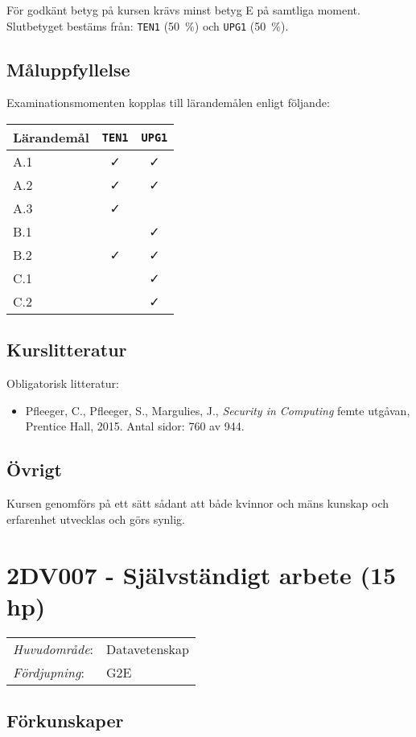 För godkänt betyg på kursen krävs minst betyg E på samtliga moment.
Slutbetyget bestäms från: \texttt{TEN1} (50~\%) och \texttt{UPG1} (50~\%).

\subsection*{Måluppfyllelse}

Examinationsmomenten kopplas till lärandemålen enligt följande:

\begin{longtable}[]{@{}lcc@{}}
\toprule
\textsf{Lärandemål} & \texttt{TEN1} & \texttt{UPG1}\tabularnewline
\midrule
\endhead
A.1 & \faCheck & \faCheck\tabularnewline
A.2 & \faCheck & \faCheck\tabularnewline
A.3 & \faCheck &\tabularnewline
B.1 & & \faCheck\tabularnewline
B.2 & \faCheck & \faCheck\tabularnewline
C.1 & & \faCheck\tabularnewline
C.2 & & \faCheck\tabularnewline
\bottomrule
\end{longtable}

\subsection*{Kurslitteratur}

Obligatorisk litteratur:

\begin{itemize}
\tightlist
\item
  Pfleeger, C., Pfleeger, S., Margulies, J., \emph{Security in
  Computing} femte utgåvan, Prentice Hall, 2015. Antal sidor: 760 av
  944.
\end{itemize}

\subsection*{Övrigt}

Kursen genomförs på ett sätt sådant att både kvinnor och mäns kunskap och erfarenhet utvecklas och görs synlig.
\pagebreak
\section*{2DV007 - Självständigt arbete (15 hp)}

\begin{tabular}{ll}\emph{Huvudområde}: & Datavetenskap\tabularnewline\emph{Fördjupning}: & G2E\tabularnewline\end{tabular}

\subsection*{Förkunskaper}

